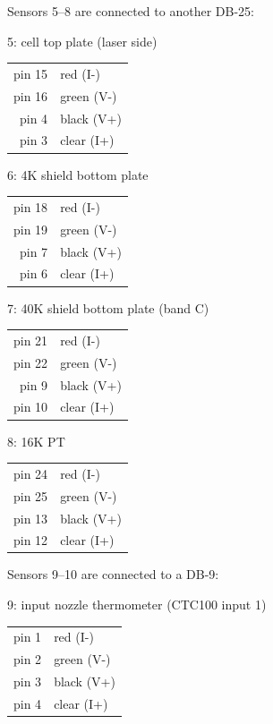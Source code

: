 Sensors 5--8 are connected to another DB-25:

5: cell top plate (laser side)

\begin{tabular}{rl}
    pin 15 & red (I-)\\
    pin 16 & green (V-)\\
     pin 4 & black (V+)\\
     pin 3 & clear (I+)\\
\end{tabular}

6: 4K shield bottom plate

\begin{tabular}{rl}
    pin 18 & red (I-)\\
    pin 19 & green (V-)\\
     pin 7 & black (V+)\\
     pin 6 & clear (I+)\\
\end{tabular}

7: 40K shield bottom plate (band C)

\begin{tabular}{rl}
    pin 21 & red (I-)\\
    pin 22 & green (V-)\\
     pin 9 & black (V+)\\
    pin 10 & clear (I+)\\
\end{tabular}

8: 16K PT

\begin{tabular}{rl}
    pin 24 & red (I-)\\
    pin 25 & green (V-)\\
    pin 13 & black (V+)\\
    pin 12 & clear (I+)\\
\end{tabular}

Sensors 9--10 are connected to a DB-9:

9: input nozzle thermometer (CTC100 input 1)

\begin{tabular}{rl}
    pin 1 & red (I-)\\
    pin 2 & green (V-)\\
    pin 3 & black (V+)\\
    pin 4 & clear (I+)\\
\end{tabular}

